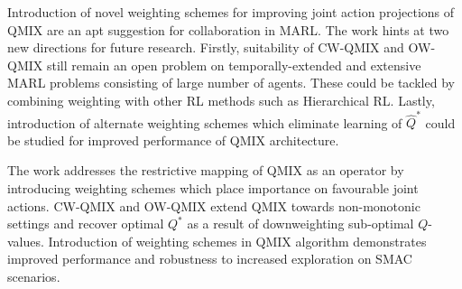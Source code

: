 \documentclass[11pt,letterpaper]{article}
\begin{document}
Introduction of novel weighting schemes for improving joint action projections of QMIX are an apt suggestion for collaboration in MARL. The work hints at two new directions for future research. Firstly, suitability of CW-QMIX and OW-QMIX still remain an open problem on temporally-extended and extensive MARL problems consisting of large number of agents. These could be tackled by combining weighting with other RL methods such as Hierarchical RL. Lastly, introduction of alternate weighting schemes which eliminate learning of $\hat{Q}^{*}$ could be studied for improved performance of QMIX architecture. 

The work addresses the restrictive mapping of QMIX as an operator by introducing weighting schemes which place importance on favourable joint actions. CW-QMIX and OW-QMIX extend QMIX towards non-monotonic settings and recover optimal $Q^{*}$ as a result of downweighting sub-optimal $Q$-values. Introduction of weighting schemes in QMIX algorithm demonstrates improved performance and robustness to increased exploration on SMAC scenarios. 
\end{document}
